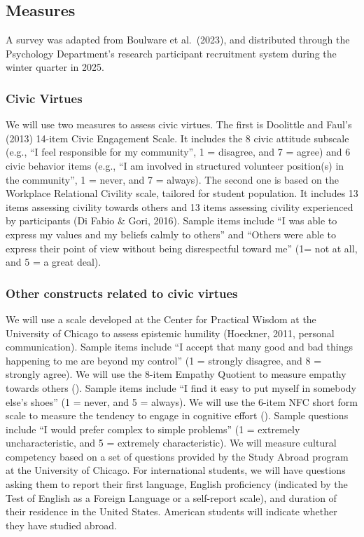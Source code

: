 \documentclass[
  man,
  floatsintext,
  longtable,
  nolmodern,
  notxfonts,
  notimes,
  colorlinks=true,linkcolor=blue,citecolor=blue,urlcolor=blue]{apa7}
\begin{document}
\subsection{Measures}\label{measures}

A survey was adapted from Boulware et al.~(2023), and distributed
through the Psychology Department's research participant recruitment
system during the winter quarter in 2025.

\subsubsection{Civic Virtues}\label{civic-virtues}

We will use two measures to assess civic virtues. The first is Doolittle
and Faul's (2013) 14-item Civic Engagement Scale. It includes the 8
civic attitude subscale (e.g., ``I feel responsible for my community'',
1 = disagree, and 7 = agree) and 6 civic behavior items (e.g., ``I am
involved in structured volunteer position(s) in the community'', 1 =
never, and 7 = always). The second one is based on the Workplace
Relational Civility scale, tailored for student population. It includes
13 items assessing civility towards others and 13 items assessing
civility experienced by participants (Di Fabio \& Gori, 2016). Sample
items include ``I was able to express my values and my beliefs calmly to
others'' and ``Others were able to express their point of view without
being disrespectful toward me'' (1= not at all, and 5 = a great deal).

\subsubsection{Other constructs related to civic
virtues}\label{other-constructs-related-to-civic-virtues}

We will use a scale developed at the Center for Practical Wisdom at the
University of Chicago to assess epistemic humility (Hoeckner, 2011,
personal communication). Sample items include ``I accept that many good
and bad things happening to me are beyond my control'' (1 = strongly
disagree, and 8 = strongly agree). We will use the 8-item Empathy
Quotient to measure empathy towards others
(). Sample
items include ``I find it easy to put myself in somebody else's shoes''
(1 = never, and 5 = always). We will use the 6-item NFC short form scale
to measure the tendency to engage in cognitive effort
(). Sample questions include ``I would prefer
complex to simple problems'' (1 = extremely uncharacteristic, and 5 =
extremely characteristic). We will measure cultural competency based on
a set of questions provided by the Study Abroad program at the
University of Chicago. For international students, we will have
questions asking them to report their first language, English
proficiency (indicated by the Test of English as a Foreign Language or a
self-report scale), and duration of their residence in the United
States. American students will indicate whether they have studied
abroad.
\end{document}
